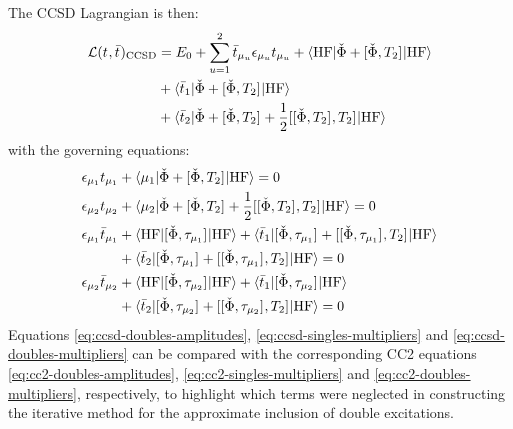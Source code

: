 The \acrshort*{CCSD} Lagrangian is then:
\begin{equation}\label{eq:ccsd-lagrangian}
 \begin{aligned}
 \mathcal{L}(t_{}, \bar{t}_{})_\mathrm{CCSD}
&=
 E_0
 + \sum_{u=1}^{2}\bar{t}_{\mu_u}\epsilon_{\mu_u}t_{\mu_u}
 + \braket{\mathrm{HF} | \check{\Phi} + [ \check{\Phi}, T_2 ]^{} | \mathrm{HF}} \\
 &+ \braket{\bar{t}_{1} | \check{\Phi} + [ \check{\Phi}, T_2 ]^{} | \mathrm{HF}} \\
 &+ \braket{\bar{t}_{2} | \check{\Phi} + [ \check{\Phi}, T_2 ]^{}
   +\frac{1}{2}[ [ \check{\Phi}, T_2 ]^{}, T_2 ]^{} | \mathrm{HF}}
  \end{aligned}
\end{equation}
with the governing equations:
\begin{subequations}\label{eq:ccsd-equations}
  \begin{align}
   \epsilon_{\mu_1}t_{\mu_1} &+ \braket{\mu_1 | \check{\Phi} + [ \check{\Phi}, T_2 ]^{} | \mathrm{HF}}
             = 0 \label{eq:ccsd-singles-amplitudes}\\
   \epsilon_{\mu_2}t_{\mu_2} &+
   \braket{\mu_2 | \check{\Phi} + [ \check{\Phi}, T_2 ]^{} +\frac{1}{2}[ [ \check{\Phi}, T_2 ]^{}, T_2 ]^{} | \mathrm{HF}}
             = 0 \label{eq:ccsd-doubles-amplitudes}\\
    \epsilon_{\mu_1}\bar{t}_{\mu_1} &+
    \braket{\mathrm{HF} | [ \check{\Phi}, \tau_{\mu_1} ]^{} | \mathrm{HF}} +
    \braket{\bar{t}_{1} |
      [ \check{\Phi}, \tau_{\mu_1} ]^{}
    + [ [ \check{\Phi}, \tau_{\mu_1} ]^{}, T_2 ]^{}
    | \mathrm{HF}} \nonumber \\
   &+ \braket{\bar{t}_{2} |
      [ \check{\Phi}, \tau_{\mu_1} ]^{}
    + [ [ \check{\Phi}, \tau_{\mu_1} ]^{}, T_2 ]^{}
    | \mathrm{HF}}
             = 0 \label{eq:ccsd-singles-multipliers} \\
    \epsilon_{\mu_2}\bar{t}_{\mu_2} &+
    \braket{\mathrm{HF} | [ \check{\Phi}, \tau_{\mu_2} ]^{} | \mathrm{HF}} +
    \braket{\bar{t}_{1} |
      [ \check{\Phi}, \tau_{\mu_2} ]^{}
    | \mathrm{HF}} \nonumber \\
   &+ \braket{\bar{t}_{2} |
      [ \check{\Phi}, \tau_{\mu_2} ]^{}
    + [ [ \check{\Phi}, \tau_{\mu_2} ]^{}, T_2 ]^{}
    | \mathrm{HF}}
             = 0 \label{eq:ccsd-doubles-multipliers}
  \end{align}
\end{subequations}
Equations \eqref{eq:ccsd-doubles-amplitudes},
\eqref{eq:ccsd-singles-multipliers} and \eqref{eq:ccsd-doubles-multipliers} can
be compared with the corresponding \acrshort{CC2} equations
\eqref{eq:cc2-doubles-amplitudes}, \eqref{eq:cc2-singles-multipliers} and
\eqref{eq:cc2-doubles-multipliers}, respectively, to highlight which terms were neglected in
constructing the iterative method for the approximate inclusion of double excitations.

